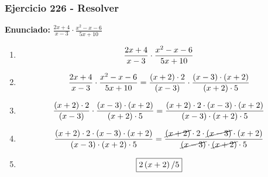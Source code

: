 \documentclass[11pt,a4paper]{article}
\newcommand{\fitmath}[1]{%
\[
\setbox0=\hbox{$\displaystyle #1$}%
\ifdim\wd0>\linewidth
\resizebox{\linewidth}{!}{$\displaystyle #1$}%
\else
#1%
\fi
\]
}
\begin{document}
\subsubsection*{Ejercicio 226 - Resolver}
\textbf{Enunciado:} $ \frac{2 x + 4}{x - 3} \cdot \frac{x^{2} - x - 6}{5 x + 10} $\par
\begin{enumerate}[leftmargin=2em]
\item \fitmath{\frac{2 x + 4}{x - 3} \cdot \frac{x^{2} - x - 6}{5 x + 10}}
\item \fitmath{\frac{2 x + 4}{x - 3} \cdot \frac{x^{2} - x - 6}{5 x + 10}= \frac{\left(x + 2\right)\cdot 2}{\left(x - 3\right)} \cdot \frac{\left(x - 3\right)\cdot \left(x + 2\right)}{\left(x + 2\right)\cdot 5}}
\item \fitmath{\frac{\left(x + 2\right)\cdot 2}{\left(x - 3\right)}\cdot \frac{\left(x - 3\right)\cdot \left(x + 2\right)}{\left(x + 2\right)\cdot 5}= \frac{\left(x + 2\right)\cdot 2\cdot \left(x - 3\right)\cdot \left(x + 2\right)}{\left(x - 3\right)\cdot \left(x + 2\right)\cdot 5}}
\item \fitmath{\frac{\left(x + 2\right)\cdot 2\cdot \left(x - 3\right)\cdot \left(x + 2\right)}{\left(x - 3\right)\cdot \left(x + 2\right)\cdot 5}= \frac{\cancel{\left(x + 2\right)}\cdot 2\cdot \cancel{\left(x - 3\right)}\cdot \left(x + 2\right)}{\cancel{\left(x - 3\right)}\cdot \cancel{\left(x + 2\right)}\cdot 5}}
\item \fitmath{\boxed{2 \left(x + 2\right) / 5}}
\end{enumerate}

\vspace{0.12cm}
\end{document}
